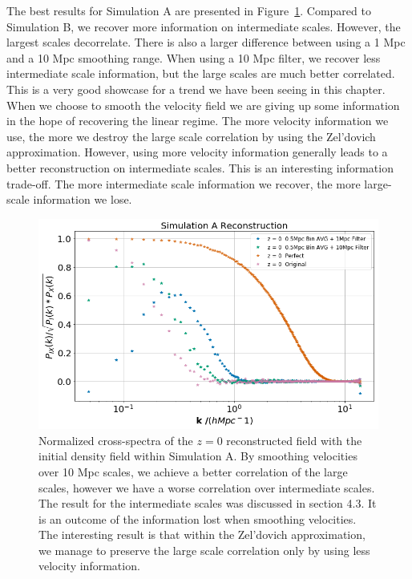The best results for Simulation A are presented in Figure~\ref{fig:4.6}. Compared to Simulation B, we recover more information on intermediate scales. However, the largest scales decorrelate. There is also a larger difference between using a 1 Mpc and a 10 Mpc smoothing range. When using a 10 Mpc filter, we recover less intermediate scale information, but the large scales are much better correlated. This is a very good showcase for a trend we have been seeing in this chapter. When we choose to smooth the velocity field we are giving up some information in the hope of recovering the linear regime. The more velocity information we use, the more we destroy the large scale correlation by using the Zel'dovich approximation. However, using more velocity information generally leads to a better reconstruction on intermediate scales. This is an interesting information trade-off. The more intermediate scale information we recover, the more large-scale information we lose.


\begin{figure}
    \centering
    \includegraphics[width=1\columnwidth]{images/realRecon/simARecon.png}%
    
    \caption{
        Normalized cross-spectra of the $z=0$ reconstructed field with the initial density field within Simulation A. By smoothing velocities over 10 Mpc scales, we achieve a better correlation of the large scales, however we have a worse correlation over intermediate scales. The result for the intermediate scales was discussed in section 4.3. It is an outcome of the information lost when smoothing velocities. The interesting result is that within the Zel'dovich approximation, we manage to preserve the large scale correlation only by using less velocity information.
    }
    
    \label{fig:4.6}
\end{figure}

